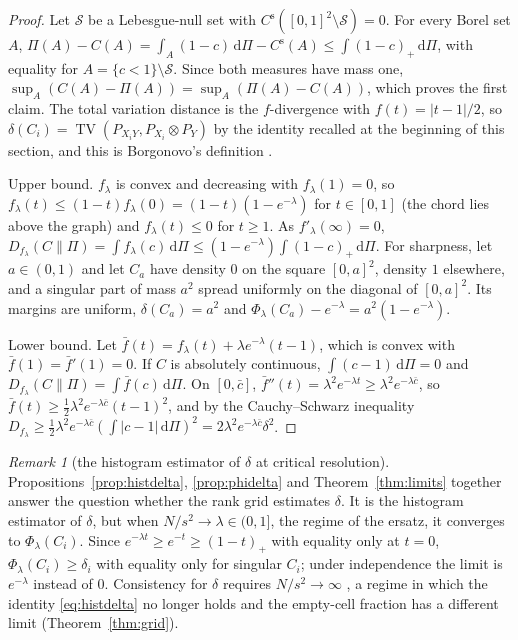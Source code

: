 \documentclass[11pt,a4paper]{article}
\theoremstyle{definition}
\theoremstyle{remark}
\newtheorem{remark}[theorem]{Remark}
\newcommand{\TV}{\operatorname{TV}}
\newcommand{\cS}{\mathcal{S}}
\begin{document}
\begin{proof}
Let $\cS$ be a Lebesgue-null set with $C^{\mathrm s}([0,1]^2\setminus\cS)=0$. For every Borel set $A$, $\Pi(A)-C(A)=\int_A(1-c)\,\mathrm{d}\Pi-C^{\mathrm s}(A)\le\int(1-c)_+\,\mathrm{d}\Pi$, with equality for $A=\{c<1\}\setminus\cS$. Since both measures have mass one, $\sup_A(C(A)-\Pi(A))=\sup_A(\Pi(A)-C(A))$, which proves the first claim. The total variation distance is the $f$-divergence with $f(t)=|t-1|/2$, so $\delta(C_i)=\TV(P_{X_iY},P_{X_i}\otimes P_Y)$ by the identity recalled at the beginning of this section, and this is Borgonovo's definition \citep{borgonovo2007,plischke2019}.

Upper bound. $f_\lambda$ is convex and decreasing with $f_\lambda(1)=0$, so $f_\lambda(t)\le(1-t)f_\lambda(0)=(1-t)(1-e^{-\lambda})$ for $t\in[0,1]$ (the chord lies above the graph) and $f_\lambda(t)\le0$ for $t\ge1$. As $f'_\lambda(\infty)=0$, $D_{f_\lambda}(C\|\Pi)=\int f_\lambda(c)\,\mathrm{d}\Pi\le(1-e^{-\lambda})\int(1-c)_+\,\mathrm{d}\Pi$. For sharpness, let $a\in(0,1)$ and let $C_a$ have density $0$ on the square $[0,a]^2$, density $1$ elsewhere, and a singular part of mass $a^2$ spread uniformly on the diagonal of $[0,a]^2$. Its margins are uniform, $\delta(C_a)=a^2$ and $\Phi_\lambda(C_a)-e^{-\lambda}=a^2(1-e^{-\lambda})$.

Lower bound. Let $\bar f(t)=f_\lambda(t)+\lambda e^{-\lambda}(t-1)$, which is convex with $\bar f(1)=\bar f'(1)=0$. If $C$ is absolutely continuous, $\int(c-1)\,\mathrm{d}\Pi=0$ and $D_{f_\lambda}(C\|\Pi)=\int\bar f(c)\,\mathrm{d}\Pi$. On $[0,\bar c]$, $\bar f''(t)=\lambda^2e^{-\lambda t}\ge\lambda^2e^{-\lambda\bar c}$, so $\bar f(t)\ge\frac12\lambda^2e^{-\lambda\bar c}(t-1)^2$, and by the Cauchy--Schwarz inequality $D_{f_\lambda}\ge\frac12\lambda^2e^{-\lambda\bar c}(\int|c-1|\,\mathrm{d}\Pi)^2=2\lambda^2e^{-\lambda\bar c}\delta^2$.
\end{proof}

\begin{remark}[the histogram estimator of $\delta$ at critical resolution]\label{rem:inconsistent}
Propositions~\ref{prop:histdelta}, \ref{prop:phidelta} and Theorem~\ref{thm:limits} together answer the question whether the rank grid estimates $\delta$. It is the histogram estimator of $\delta$, but when $N/s^2\to\lambda\in(0,1]$, the regime of the ersatz, it converges to $\Phi_\lambda(C_i)$. Since $e^{-\lambda t}\ge e^{-t}\ge(1-t)_+$ with equality only at $t=0$, $\Phi_\lambda(C_i)\ge\delta_i$ with equality only for singular $C_i$; under independence the limit is $e^{-\lambda}$ instead of $0$. Consistency for $\delta$ requires $N/s^2\to\infty$ \citep{devroye1985}, a regime in which the identity \eqref{eq:histdelta} no longer holds and the empty-cell fraction has a different limit (Theorem~\ref{thm:grid}).
\end{remark}
\end{document}
